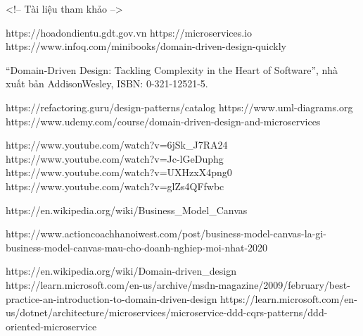<!-- Tài liệu tham khảo -->

https://hoadondientu.gdt.gov.vn
https://microservices.io
https://www.infoq.com/minibooks/domain-driven-design-quickly

“Domain-Driven Design: Tackling Complexity in the Heart of Software”, nhà xuất bản AddisonWesley, ISBN: 0-321-12521-5.

https://refactoring.guru/design-patterns/catalog
https://www.uml-diagrams.org
https://www.udemy.com/course/domain-driven-design-and-microservices



https://www.youtube.com/watch?v=6jSk_J7RA24
https://www.youtube.com/watch?v=Jc-lGeDuphg
https://www.youtube.com/watch?v=UXHzxX4png0
https://www.youtube.com/watch?v=glZs4QFfwbc



https://en.wikipedia.org/wiki/Business_Model_Canvas

https://www.actioncoachhanoiwest.com/post/business-model-canvas-la-gi-business-model-canvas-mau-cho-doanh-nghiep-moi-nhat-2020


https://en.wikipedia.org/wiki/Domain-driven_design
https://learn.microsoft.com/en-us/archive/msdn-magazine/2009/february/best-practice-an-introduction-to-domain-driven-design
https://learn.microsoft.com/en-us/dotnet/architecture/microservices/microservice-ddd-cqrs-patterns/ddd-oriented-microservice